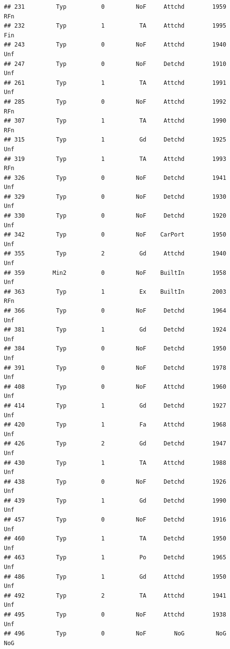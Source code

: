 \documentclass[]{article}
\begin{document}
\begin{verbatim}
## 231         Typ          0         NoF     Attchd        1959          RFn
## 232         Typ          1          TA     Attchd        1995          Fin
## 243         Typ          0         NoF     Attchd        1940          Unf
## 247         Typ          0         NoF     Detchd        1910          Unf
## 261         Typ          1          TA     Attchd        1991          Unf
## 285         Typ          0         NoF     Attchd        1992          RFn
## 307         Typ          1          TA     Attchd        1990          RFn
## 315         Typ          1          Gd     Detchd        1925          Unf
## 319         Typ          1          TA     Attchd        1993          RFn
## 326         Typ          0         NoF     Detchd        1941          Unf
## 329         Typ          0         NoF     Detchd        1930          Unf
## 330         Typ          0         NoF     Detchd        1920          Unf
## 342         Typ          0         NoF    CarPort        1950          Unf
## 355         Typ          2          Gd     Attchd        1940          Unf
## 359        Min2          0         NoF    BuiltIn        1958          Unf
## 363         Typ          1          Ex    BuiltIn        2003          RFn
## 366         Typ          0         NoF     Detchd        1964          Unf
## 381         Typ          1          Gd     Detchd        1924          Unf
## 384         Typ          0         NoF     Detchd        1950          Unf
## 391         Typ          0         NoF     Detchd        1978          Unf
## 408         Typ          0         NoF     Attchd        1960          Unf
## 414         Typ          1          Gd     Detchd        1927          Unf
## 420         Typ          1          Fa     Attchd        1968          Unf
## 426         Typ          2          Gd     Detchd        1947          Unf
## 430         Typ          1          TA     Attchd        1988          Unf
## 438         Typ          0         NoF     Detchd        1926          Unf
## 439         Typ          1          Gd     Detchd        1990          Unf
## 457         Typ          0         NoF     Detchd        1916          Unf
## 460         Typ          1          TA     Detchd        1950          Unf
## 463         Typ          1          Po     Detchd        1965          Unf
## 486         Typ          1          Gd     Attchd        1950          Unf
## 492         Typ          2          TA     Attchd        1941          Unf
## 495         Typ          0         NoF     Attchd        1938          Unf
## 496         Typ          0         NoF        NoG         NoG          NoG

\end{verbatim}
\end{document}
